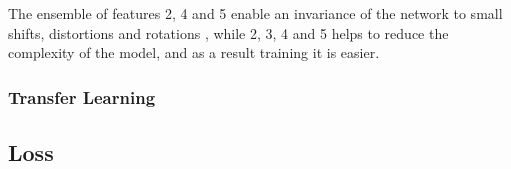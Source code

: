 \documentclass[class=report, crop=false, a4paper, 12pt]{standalone}
\begin{document}
The ensemble of features 2, 4 and 5 enable an invariance of the network to small shifts, distortions and rotations \autocite{guRecentAdvancesConvolutional2018,lecunDeepLearning2015}, while 2, 3, 4 and 5 helps to reduce the complexity of the model, and as a result training it is easier\autocite{guRecentAdvancesConvolutional2018,liSurveyConvolutionalNeural2022}.

\subsubsection{Transfer Learning}

\subsection{Loss}
\end{document}
